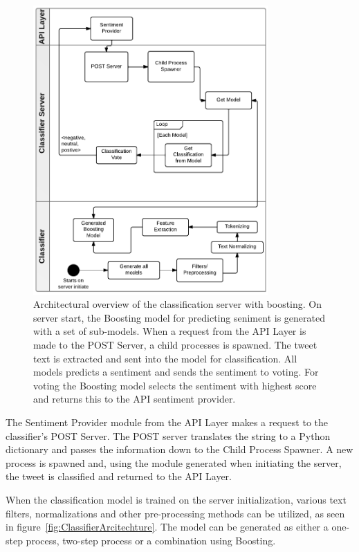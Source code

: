 \begin{figure}[htb!]
 \begin{center}
     \includegraphics[width=0.8\textwidth]{../img/ClassifierArcitechture30Boosting.pdf}
 \end{center}
 \caption[Architectural overview of the classification server with Boosting.]{Architectural overview of the classification server with boosting. On server start, the Boosting model for predicting seniment is generated with a set of sub-models. When a request from the API Layer is made to the POST Server, a child processes is spawned. The tweet text is extracted and sent into the model for classification. All models predicts a sentiment and sends the sentiment to voting. For voting the Boosting model selects the sentiment with highest score and returns this to the API sentiment provider.}
 \label{fig:ClassifierArcitechtureBoosting}
\end{figure}

The Sentiment Provider module from the API Layer makes a request to the classifier's POST Server. The POST server translates the string to a Python dictionary and passes the information down to the Child Process Spawner. A new process is spawned and, using the module generated when initiating the server, the tweet is classified and returned to the API Layer.

When the classification model is trained on the server initialization, various text filters, normalizations and other pre-processing methods can be utilized, as seen in figure~\ref{fig:ClassifierArcitechture}. The model can be generated as either a one-step process, two-step process or a combination using Boosting. 

